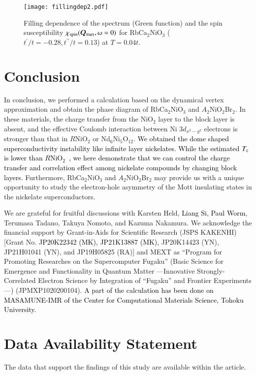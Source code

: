 \documentclass[%
 aip,
 amsmath,amssymb,
 reprint,%
]{revtex4-1}
\newcommand{\mk}[1]{{\textcolor{black}{#1}}}
\begin{document}
\begin{figure}
\centering
\texttt{[image: fillingdep2.pdf]}
\caption{Filling dependence of the spectrum (Green function) and the spin susceptibility $\chi_{\rm spin}({\bm Q}_{\rm max},\omega=0)$ for RbCa$_2$NiO$_3$ ($t^{\prime}/t=-0.28, t^{\prime\prime}/t=0.13$) at $T=0.04t$.}
\label{fig:fillingdep}
\end{figure}

\section{Conclusion\label{sec:5}}
In conclusion, we performed a calculation based on the dynamical vertex approximation and obtain the phase diagram of RbCa$_2$NiO$_3$ and $A_2$NiO$_2$Br$_2$. In these materials, the charge transfer from the NiO$_2$ layer to the block layer is absent, and the effective Coulomb interaction between Ni 3$d_{x^2-y^2}$ electrons is stronger than that in $R$NiO$_2$ or Nd$_6$Ni$_5$O$_{12}$. \mk{We obtained the dome shaped superconductivity instability like infinite layer nickelates. While the estimated $T_{\rm c}$ is lower than $R$NiO$_2$~\cite{Kitatani_2020}, we here demonstrate that we can control the charge transfer and correlation effect among nickelate compounds by changing block layers.}  Furthermore, RbCa$_2$NiO$_3$ and $A_2$NiO$_2$Br$_2$ may provide us with a unique opportunity to study the electron-hole asymmetry of the Mott insulating states in the nickelate superconductors.

\begin{acknowledgments}
We are grateful for fruitful discussions with Karsten Held, \mk{Liang Si, Paul Worm,} Terumasa Tadano, Takuya Nomoto, and Kazuma Nakamura. 
We acknowledge the financial support by Grant-in-Aids for Scientific Research (JSPS KAKENHI) [Grant No. \mk{JP20K22342 (MK), JP21K13887 (MK),} JP20K14423 (YN), JP21H01041 (YN), and JP19H05825 (RA)] and MEXT as ``Program for Promoting Researches on the Supercomputer Fugaku'' (Basic Science for Emergence and Functionality in Quantum Matter ---Innovative Strongly-Correlated Electron Science by Integration of ``Fugaku'' and Frontier Experiments---) (JPMXP1020200104). \mk{A part of the calculation has been done on MASAMUNE-IMR of the Center for Computational Materials Science, Tohoku University.}
\end{acknowledgments}

\section*{Data Availability Statement}
The data that support the findings of this study are available within the article.

\end{document}

